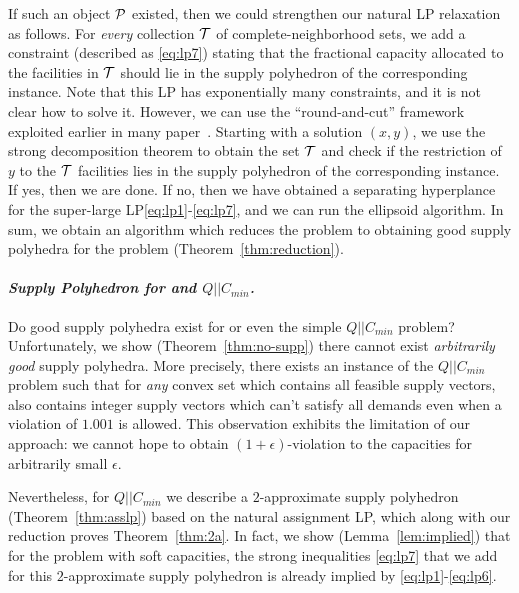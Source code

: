  If such an object ${\cal P}$ existed, then we could strengthen our natural LP relaxation as follows. For {\em every} collection ${\cal T}$ of complete-neighborhood sets, we add a constraint (described as \eqref{eq:lp7}) stating that the fractional capacity allocated to the facilities in ${\cal T}$ should
 lie in the supply polyhedron of the corresponding \cckp instance. Note that this LP has exponentially many constraints, and it is not clear how to solve it. However, we can use the ``round-and-cut'' framework exploited earlier in many paper~\cite{Carr et al, Chakrabarty-Chekuri-Khanna-Korula, An-Svennson-Singh, Shi Li 1, Shi Li 2, Shi Li 3}. Starting with a solution $(x,y)$, we use the strong decomposition theorem to obtain the set ${\cal T}$ and check if the restriction of $y$ to the ${\cal T}$ facilities lies in the supply polyhedron of the corresponding \cckp instance. If yes, then we are done.
 If no, then we have obtained a separating hyperplance for the super-large LP\eqref{eq:lp1}-\eqref{eq:lp7}, and we can run the ellipsoid algorithm. In sum, we obtain an algorithm which reduces the \mckc problem to obtaining good supply polyhedra for the \cckp problem (Theorem~\ref{thm:reduction}).%

\paragraph{\emph{Supply Polyhedron for \cckp and $Q||C_{min}$.}}
Do good supply polyhedra exist for \cckp or even the simple $Q||C_{min} $ problem? Unfortunately, we show (Theorem~\ref{thm:no-supp}) there cannot exist {\em arbitrarily good} supply polyhedra. More precisely, there exists an instance of the $Q||C_{min}$ problem such that 
for {\em any} convex set which contains all feasible supply vectors, also contains integer supply vectors which can't satisfy all demands even when a violation of $1.001$ is allowed. This observation exhibits the limitation of our approach: we cannot hope to obtain $(1+\epsilon)$-violation to the capacities for arbitrarily small $\epsilon$.

Nevertheless, for $Q||C_{min}$ we describe a $2$-approximate supply polyhedron (Theorem~\ref{thm:asslp}) based on the natural assignment LP, which along with our reduction proves Theorem~\ref{thm:2a}. In fact, we show (Lemma~\ref{lem:implied}) that for the \mckc problem with soft capacities, the strong  inequalities \eqref{eq:lp7} that we add for this $2$-approximate supply polyhedron is already implied by \eqref{eq:lp1}-\eqref{eq:lp6}.

